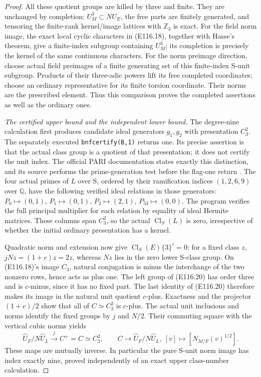 \begin{proof}
All these quotient groups are killed by three and finite.
They are unchanged by completion: $U_M^3\subset NU_E$,
the free parts are finitely generated, and tensoring the
finite-rank kernel/image lattices with $\mathbb Z_3$ is
exact. For the field norm image, the exact local cyclic
characters in (E116.18), together with Hasse's theorem,
give a finite-index subgroup containing $U_M^3$;
its completion is precisely the kernel of the same
continuous characters. For the norm preimage direction,
choose actual field preimages of a finite generating set
of this finite-index S-unit subgroup. Products of their
three-adic powers lift its free completed coordinates;
choose an ordinary representative for its finite torsion
coordinate. Their norms are the prescribed element.
Thus this comparison proves the
completed assertions as well as the ordinary ones.

\emph{The certified upper bound and the independent lower bound.}
The degree-nine calculation first produces candidate
ideal generators $g_1,g_2$ with presentation $C_3^2$.
The separately executed \texttt{bnfcertify(B,1)} returns
one. Its precise assertion is that the actual class
group is a quotient of that presentation; it does not
certify the unit index. The official PARI documentation
states exactly this distinction, and its source performs
the prime-generation test before the flag-one return
\cite[\texttt{bnfcertify}, flag1]{E_PARICertifiedUnits}.
The four actual primes of $L$ over S, ordered by their
ramification indices $(1,2,6,9)$ over $\mathbb Q$, have
the following verified ideal relations in those generators:
$P_0\mapsto(0,1)$, $P_1\mapsto(0,1)$,
$P_2\mapsto(2,1)$, $P_{53}\mapsto(0,0)$.
The program verifies the full principal multiplier for
each relation by equality of ideal Hermite matrices.
These columns span $C_3^2$, so the actual
$\operatorname{Cl}_S(L)$ is zero, irrespective of whether
the initial ordinary presentation has a kernel.

Quadratic norm and extension now give
$\operatorname{Cl}_S(E)\{3\}^{c}=0$:
for a fixed class $z$, $jNz=(1+c)z=2z$, whereas
$Nz$ lies in the zero lower S-class group.
On (E116.18)'s image $C_3$, natural conjugation is
minus the interchange of the two nonzero rows, hence
acts as plus one. The left group of (E116.20) has order
three and is $c$-minus, since it has no fixed part.
The last identity of (E116.20) therefore makes its
image in the natural unit quotient $c$-plus.
Exactness and the projector $(1+c)/2$ show that all of
$C\simeq C_3^2$ is $c$-plus.
The actual unit inclusions and norms identify the fixed
groups by $j$ and $N/2$. Their commuting square with
the vertical cubic norms yields
\[
 \widehat U_F/N\widehat U_L
       \xrightarrow{\ j\ } C^+=C\simeq C_3^2,
 \qquad
 C\longrightarrow\widehat U_F/N\widehat U_L,
              \ [v]\longmapsto[N_{M/F}(v)^{1/2}].
 \tag{E116.21}
\]
These maps are mutually inverse. In particular the pure
S-unit norm image has index exactly nine, proved
independently of an exact upper class-number calculation.


\end{proof}
